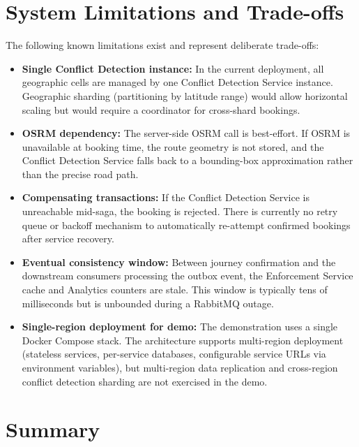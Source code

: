 \documentclass[12pt,a4paper]{article}
\begin{document}
\section{System Limitations and Trade-offs}

The following known limitations exist and represent deliberate trade-offs:

\begin{itemize}[leftmargin=*]
  \item \textbf{Single Conflict Detection instance:} In the current deployment, all geographic cells are managed by one Conflict Detection Service instance. Geographic sharding (partitioning by latitude range) would allow horizontal scaling but would require a coordinator for cross-shard bookings.

  \item \textbf{OSRM dependency:} The server-side OSRM call is best-effort. If OSRM is unavailable at booking time, the route geometry is not stored, and the Conflict Detection Service falls back to a bounding-box approximation rather than the precise road path.

  \item \textbf{Compensating transactions:} If the Conflict Detection Service is unreachable mid-saga, the booking is rejected. There is currently no retry queue or backoff mechanism to automatically re-attempt confirmed bookings after service recovery.

  \item \textbf{Eventual consistency window:} Between journey confirmation and the downstream consumers processing the outbox event, the Enforcement Service cache and Analytics counters are stale. This window is typically tens of milliseconds but is unbounded during a RabbitMQ outage.

  \item \textbf{Single-region deployment for demo:} The demonstration uses a single Docker Compose stack. The architecture supports multi-region deployment (stateless services, per-service databases, configurable service URLs via environment variables), but multi-region data replication and cross-region conflict detection sharding are not exercised in the demo.
\end{itemize}

\section{Summary}
\end{document}
